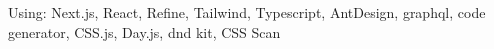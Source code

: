 Using: Next.js, React, Refine, Tailwind, Typescript, AntDesign, graphql, code generator, CSS.js, Day.js, dnd kit, CSS Scan